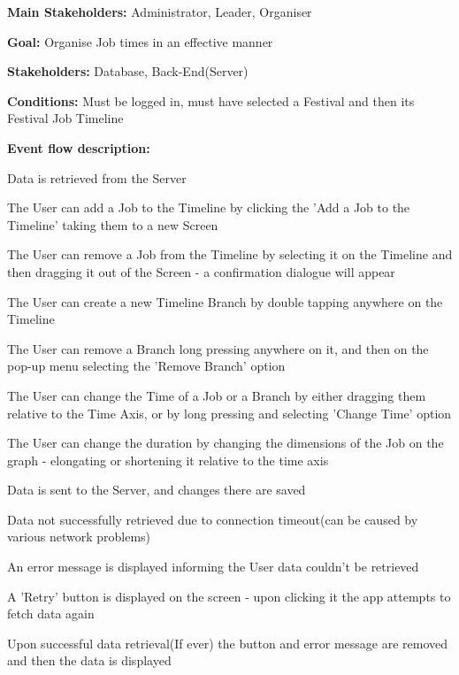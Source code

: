 			\noindent {}
			\begin{packed_item}
				\item \textbf{Main Stakeholders:} Administrator, Leader, Organiser
				\item \textbf{Goal:} Organise Job times in an effective manner
				\item \textbf{Stakeholders: } Database, Back-End(Server)
				\item \textbf{Conditions: } Must be logged in, must have selected a Festival and then its Festival Job Timeline
				\item \textbf{Event flow description: }
				\begin{packed_enum}
					\item Data is retrieved from the Server
					\item The User can add a Job to the Timeline by clicking the 'Add a Job to the Timeline' taking them to a new Screen
					\item The User can remove a Job from the Timeline by selecting it on the Timeline and then dragging it out of the Screen - a confirmation dialogue will appear
					\item The User can create a new Timeline Branch by double tapping anywhere on the Timeline
					\item The User can remove a Branch long pressing anywhere on it, and then on the pop-up menu selecting the 'Remove Branch' option
					\item The User can change the Time of a Job or a Branch by either dragging them relative to the Time Axis, or by long pressing and selecting 'Change Time' option
					\item The User can change the duration by changing the dimensions of the Job on the graph - elongating or shortening it relative to the time axis
					\item Data is sent to the Server, and changes there are saved
				\end{packed_enum}
				
				\begin{packed_item}
					\item[1.a] Data not successfully retrieved due to connection timeout(can be caused by various network problems)
					\item[] \begin{packed_enum}
						\item An error message is displayed informing the User data couldn't be retrieved
						\item A 'Retry' button is displayed on the screen - upon clicking it the app attempts to fetch data again
						\item Upon successful data retrieval(If ever) the button and error message are removed and then the data is displayed
					\end{packed_enum}
					

\end{packed_item}
\end{packed_item}
